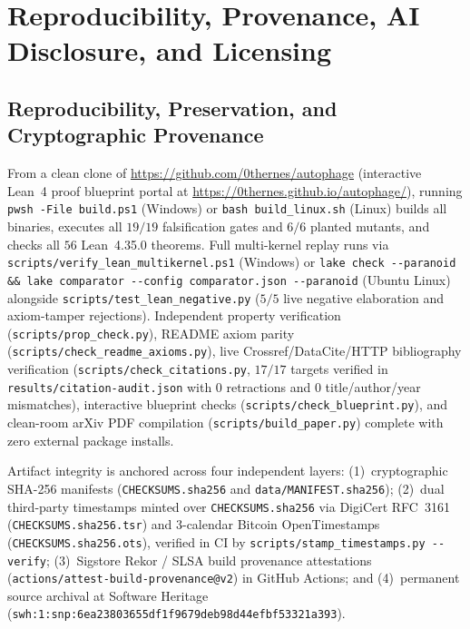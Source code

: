 \documentclass[11pt,reqno]{amsart}
\theoremstyle{plain}
\theoremstyle{definition}
\theoremstyle{remark}
\newcommand{\code}[1]{{\footnotesize\nolinkurl{#1}}}
\begin{document}
\section{Reproducibility, Provenance, AI Disclosure, and Licensing}
\label{sec:repro}

\subsection{Reproducibility, Preservation, and Cryptographic Provenance}
From a clean clone of \url{https://github.com/0thernes/autophage} (interactive Lean~4 proof blueprint portal at \url{https://0thernes.github.io/autophage/}), running \code{pwsh -File build.ps1} (Windows) or \code{bash build_linux.sh} (Linux) builds all binaries, executes all $19/19$ falsification gates and $6/6$ planted mutants, and checks all $56$ Lean~4.35.0 theorems. Full multi-kernel replay runs via \code{scripts/verify_lean_multikernel.ps1} (Windows) or \code{lake check --paranoid \&\& lake comparator --config comparator.json --paranoid} (Ubuntu Linux) alongside \code{scripts/test_lean_negative.py} ($5/5$ live negative elaboration and axiom-tamper rejections). Independent property verification (\code{scripts/prop_check.py}), README axiom parity (\code{scripts/check_readme_axioms.py}), live Crossref/DataCite/HTTP bibliography verification (\code{scripts/check_citations.py}, $17/17$ targets verified in \code{results/citation-audit.json} with $0$ retractions and $0$ title/author/year mismatches), interactive blueprint checks (\code{scripts/check_blueprint.py}), and clean-room arXiv PDF compilation (\code{scripts/build_paper.py}) complete with zero external package installs.

Artifact integrity is anchored across four independent layers: (1)~cryptographic SHA-256 manifests (\code{CHECKSUMS.sha256} and \code{data/MANIFEST.sha256}); (2)~dual third-party timestamps minted over \code{CHECKSUMS.sha256} via DigiCert RFC~3161 (\code{CHECKSUMS.sha256.tsr}) and $3$-calendar Bitcoin OpenTimestamps (\code{CHECKSUMS.sha256.ots}), verified in CI by \code{scripts/stamp_timestamps.py --verify}; (3)~Sigstore Rekor / SLSA build provenance attestations (\code{actions/attest-build-provenance@v2}) in GitHub Actions; and (4)~permanent source archival at Software Heritage (\code{swh:1:snp:6ea23803655df1f9679deb98d44efbf53321a393}).
\end{document}
